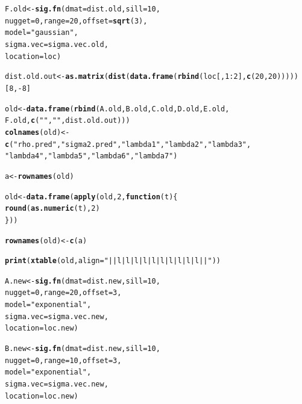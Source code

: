 \documentclass{article}\usepackage[]{graphicx}\usepackage[]{color}
\makeatletter
\newcommand{\hlnum}[1]{\textcolor[rgb]{0.686,0.059,0.569}{#1}}%
\newcommand{\hlstr}[1]{\textcolor[rgb]{0.192,0.494,0.8}{#1}}%
\newcommand{\hlopt}[1]{\textcolor[rgb]{0,0,0}{#1}}%
\newcommand{\hlstd}[1]{\textcolor[rgb]{0.345,0.345,0.345}{#1}}%
\newcommand{\hlkwa}[1]{\textcolor[rgb]{0.161,0.373,0.58}{\textbf{#1}}}%
\newcommand{\hlkwb}[1]{\textcolor[rgb]{0.69,0.353,0.396}{#1}}%
\newcommand{\hlkwc}[1]{\textcolor[rgb]{0.333,0.667,0.333}{#1}}%
\newcommand{\hlkwd}[1]{\textcolor[rgb]{0.737,0.353,0.396}{\textbf{#1}}}%
\newenvironment{kframe}{%
 \def\at@end@of@kframe{}%
 \ifinner\ifhmode%
  \def\at@end@of@kframe{\end{minipage}}%
  \begin{minipage}{\columnwidth}%
 \fi\fi%
 \def\FrameCommand##1{\hskip\@totalleftmargin \hskip-\fboxsep
 \colorbox{shadecolor}{##1}\hskip-\fboxsep
     \hskip-\linewidth \hskip-\@totalleftmargin \hskip\columnwidth}%
 \MakeFramed {\advance\hsize-\width
   \@totalleftmargin\z@ \linewidth\hsize
   \@setminipage}}%
 {\par\unskip\endMakeFramed%
 \at@end@of@kframe}
\newenvironment{knitrout}{}{} %
\makeatother
\begin{document}
\begin{knitrout}
\begin{kframe}
\begin{alltt}
\hlstd{F.old} \hlkwb{<-} \hlkwd{sig.fn}\hlstd{(}\hlkwc{dmat} \hlstd{= dist.old,} \hlkwc{sill} \hlstd{=} \hlnum{10}\hlstd{,}
                \hlkwc{nugget} \hlstd{=} \hlnum{0}\hlstd{,} \hlkwc{range} \hlstd{=} \hlnum{20}\hlstd{,} \hlkwc{offset} \hlstd{=} \hlkwd{sqrt}\hlstd{(}\hlnum{3}\hlstd{),}
                \hlkwc{model} \hlstd{=} \hlstr{"gaussian"}\hlstd{,}
                \hlkwc{sigma.vec} \hlstd{= sigma.vec.old,}
                \hlkwc{location} \hlstd{= loc)}

\hlstd{dist.old.out} \hlkwb{<-} \hlkwd{as.matrix}\hlstd{(}\hlkwd{dist}\hlstd{(}\hlkwd{data.frame}\hlstd{(}\hlkwd{rbind}\hlstd{(loc[,}\hlnum{1}\hlopt{:}\hlnum{2}\hlstd{],}\hlkwd{c}\hlstd{(}\hlnum{20}\hlstd{,}\hlnum{20}\hlstd{)))))[}\hlnum{8}\hlstd{,}\hlopt{-}\hlnum{8}\hlstd{]}

\hlstd{old} \hlkwb{<-} \hlkwd{data.frame}\hlstd{(}\hlkwd{rbind}\hlstd{(A.old, B.old, C.old, D.old, E.old,}
                        \hlstd{F.old,} \hlkwd{c}\hlstd{(}\hlstr{""}\hlstd{,} \hlstr{""}\hlstd{, dist.old.out)))}
\hlkwd{colnames}\hlstd{(old)} \hlkwb{<-} \hlkwd{c}\hlstd{(}\hlstr{"rho.pred"}\hlstd{,} \hlstr{"sigma2.pred"}\hlstd{,} \hlstr{"lambda1"}\hlstd{,} \hlstr{"lambda2"}\hlstd{,} \hlstr{"lambda3"}\hlstd{,}
                      \hlstr{"lambda4"}\hlstd{,} \hlstr{"lambda5"}\hlstd{,} \hlstr{"lambda6"}\hlstd{,} \hlstr{"lambda7"}\hlstd{)}

\hlstd{a} \hlkwb{<-} \hlkwd{rownames}\hlstd{(old)}

\hlstd{old} \hlkwb{<-} \hlkwd{data.frame}\hlstd{(}\hlkwd{apply}\hlstd{(old,} \hlnum{2}\hlstd{,} \hlkwa{function}\hlstd{(}\hlkwc{t}\hlstd{)\{}
  \hlkwd{round}\hlstd{(}\hlkwd{as.numeric}\hlstd{(t),}\hlnum{2}\hlstd{)}
\hlstd{\}))}

\hlkwd{rownames}\hlstd{(old)} \hlkwb{<-} \hlkwd{c}\hlstd{(a)}

\hlkwd{print}\hlstd{(}\hlkwd{xtable}\hlstd{(old,} \hlkwc{align} \hlstd{=} \hlstr{"||l|l|l|l|l|l|l|l|l|l||"}\hlstd{))}

\hlstd{A.new} \hlkwb{<-} \hlkwd{sig.fn}\hlstd{(}\hlkwc{dmat} \hlstd{= dist.new,} \hlkwc{sill} \hlstd{=} \hlnum{10}\hlstd{,}
                \hlkwc{nugget} \hlstd{=} \hlnum{0}\hlstd{,} \hlkwc{range} \hlstd{=} \hlnum{20}\hlstd{,} \hlkwc{offset} \hlstd{=} \hlnum{3}\hlstd{,}
                \hlkwc{model} \hlstd{=} \hlstr{"exponential"}\hlstd{,}
                \hlkwc{sigma.vec} \hlstd{= sigma.vec.new,}
                \hlkwc{location} \hlstd{= loc.new)}

\hlstd{B.new} \hlkwb{<-} \hlkwd{sig.fn}\hlstd{(}\hlkwc{dmat} \hlstd{= dist.new,} \hlkwc{sill} \hlstd{=} \hlnum{10}\hlstd{,}
                \hlkwc{nugget} \hlstd{=} \hlnum{0}\hlstd{,} \hlkwc{range} \hlstd{=} \hlnum{10}\hlstd{,} \hlkwc{offset} \hlstd{=} \hlnum{3}\hlstd{,}
                \hlkwc{model} \hlstd{=} \hlstr{"exponential"}\hlstd{,}
                \hlkwc{sigma.vec} \hlstd{= sigma.vec.new,}
                \hlkwc{location} \hlstd{= loc.new)}


\end{alltt}
\end{kframe}
\end{knitrout}
\end{document}
